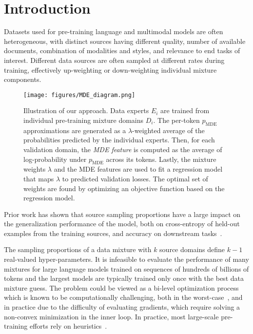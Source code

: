 \section{Introduction}
\label{intro}


Datasets used for pre-training language and multimodal models are often heterogeneous, with distinct sources having different quality, number of available documents, combination of modalities and styles, and relevance to end tasks of interest. Different data sources are often sampled at different rates during training, effectively up-weighting or down-weighting individual mixture components.


\begin{figure*}[!tp] %
    \begin{center}
        \texttt{[image: figures/MDE\_diagram.png]} %
        \caption{Illustration of our approach. Data experts $E_i$ are trained from individual pre-training mixture domains $D_i$. The per-token $p_{\text{MDE}}$ approximations are generated as a $\lambda$-weighted average of the probabilities predicted by the individual experts. Then, for each validation domain, the \emph{MDE feature} is computed as the average of log-probability under $p_{\text{MDE}}$ across its tokens. Lastly, the mixture weights $\lambda$ and the MDE features are used to fit a regression model that maps $\lambda$ to predicted validation losses. The optimal set of weights are found by optimizing an objective function based on the regression model.}
        \label{fig:mde_illustration}
    \end{center}
    \vskip -0.2in
\end{figure*}


Prior work has shown that source sampling proportions have a large impact on the generalization performance of the model, both on cross-entropy of held-out examples from the training sources, and accuracy on downstream tasks~\citep[][\textit{inter alia}]{Hashimoto2021ModelPS, doremi, flamingo, albalak2023efficientonlinedatamixing}. 





The sampling proportions of a data mixture with $k$ source domains define $k-1$ real-valued hyper-parameters. It is infeasible to evaluate the performance of many mixtures for large language models trained on sequences of hundreds of billions of tokens and the largest models are typically trained only once with the best data mixture guess.
The problem could be viewed as a bi-level optimization process which is known to be computationally challenging, both in the worst-case~\citep{grune2024completenesspolynomialhierarchynatural, bolte2025geometriccomputationalhardnessbilevel}, and in practice due to the difficulty of evaluating gradients, which require solving a non-convex minimization in the inner loop. In practice, most large-scale pre-training efforts rely on heuristics~\cite{gao2020pile800gbdatasetdiverse}.




